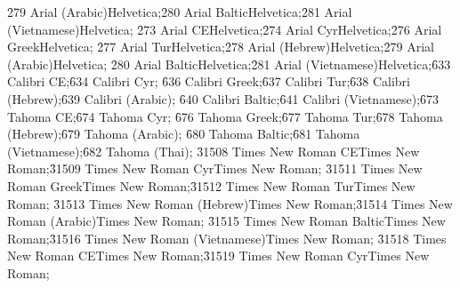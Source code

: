 {\f279\fbidi \fswiss{} Arial (Arabic){\*\falt Helvetica};}{\f280\fbidi \fswiss{} Arial Baltic{\*\falt Helvetica};}{\f281\fbidi \fswiss{} Arial (Vietnamese){\*\falt Helvetica};}
{\f273\fbidi \fswiss{} Arial CE{\*\falt Helvetica};}{\f274\fbidi \fswiss{} Arial Cyr{\*\falt Helvetica};}{\f276\fbidi \fswiss{} Arial Greek{\*\falt Helvetica};}
{\f277\fbidi \fswiss{} Arial Tur{\*\falt Helvetica};}{\f278\fbidi \fswiss{} Arial (Hebrew){\*\falt Helvetica};}{\f279\fbidi \fswiss{} Arial (Arabic){\*\falt Helvetica};}
{\f280\fbidi \fswiss{} Arial Baltic{\*\falt Helvetica};}{\f281\fbidi \fswiss{} Arial (Vietnamese){\*\falt Helvetica};}{\f633\fbidi \fswiss{} Calibri CE;}{\f634\fbidi \fswiss{} Calibri Cyr;}
{\f636\fbidi \fswiss{} Calibri Greek;}{\f637\fbidi \fswiss{} Calibri Tur;}{\f638\fbidi \fswiss{} Calibri (Hebrew);}{\f639\fbidi \fswiss{} Calibri (Arabic);}
{\f640\fbidi \fswiss{} Calibri Baltic;}{\f641\fbidi \fswiss{} Calibri (Vietnamese);}{\f673\fbidi \fswiss{} Tahoma CE;}{\f674\fbidi \fswiss{} Tahoma Cyr;}
{\f676\fbidi \fswiss{} Tahoma Greek;}{\f677\fbidi \fswiss{} Tahoma Tur;}{\f678\fbidi \fswiss{} Tahoma (Hebrew);}{\f679\fbidi \fswiss{} Tahoma (Arabic);}
{\f680\fbidi \fswiss{} Tahoma Baltic;}{\f681\fbidi \fswiss{} Tahoma (Vietnamese);}{\f682\fbidi \fswiss{} Tahoma (Thai);}
{\flomajor\f31508\fbidi \froman{} Times New Roman CE{\*\falt Times New Roman};}{\flomajor\f31509\fbidi \froman{} Times New Roman Cyr{\*\falt Times New Roman};}
{\flomajor\f31511\fbidi \froman{} Times New Roman Greek{\*\falt Times New Roman};}{\flomajor\f31512\fbidi \froman{} Times New Roman Tur{\*\falt Times New Roman};}
{\flomajor\f31513\fbidi \froman{} Times New Roman (Hebrew){\*\falt Times New Roman};}{\flomajor\f31514\fbidi \froman{} Times New Roman (Arabic){\*\falt Times New Roman};}
{\flomajor\f31515\fbidi \froman{} Times New Roman Baltic{\*\falt Times New Roman};}{\flomajor\f31516\fbidi \froman{} Times New Roman (Vietnamese){\*\falt Times New Roman};}
{\fdbmajor\f31518\fbidi \froman{} Times New Roman CE{\*\falt Times New Roman};}{\fdbmajor\f31519\fbidi \froman{} Times New Roman Cyr{\*\falt Times New Roman};}
